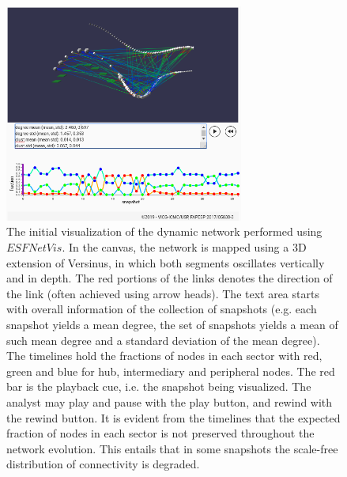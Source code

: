 \documentclass[runningheads]{llncs}
\begin{document}
\begin{figure}[!h]\centering
\includegraphics[width=0.7\textwidth]{esfNetVis2b_}
  \caption{The initial visualization of the dynamic network performed using $ESFNetVis$.
  In the canvas, the network is mapped using a 3D extension of Versinus, in which both segments oscillates vertically and in depth.
  The red portions of the links denotes the direction of the link (often achieved using arrow heads).
  The text area starts with overall information of the collection of snapshots (e.g. each snapshot yields a mean degree, the set of snapshots yields a mean of such mean degree and a standard deviation of the mean degree).
  The timelines hold the fractions of nodes in each sector with red, green and blue for hub, intermediary and peripheral nodes.
  The red bar is the playback cue, i.e. the snapshot being visualized.
  The analyst may play and pause with the play button,
  and rewind with the rewind button.
  It is evident from the timelines that the expected fraction of nodes in each sector is not preserved throughout the network evolution.
  This entails that in some snapshots the scale-free distribution of connectivity is degraded.
  }\label{env2}
\end{figure}
\end{document}
